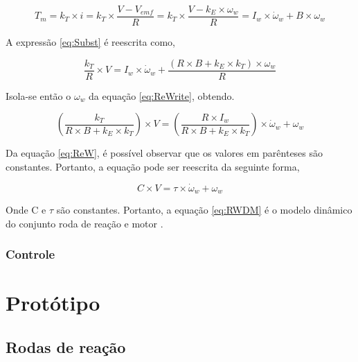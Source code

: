 \documentclass[
	12pt,				%
	openany,			%
	twoside,			%
	a4paper,			%
	english,			%
	french,				%
	spanish,			%
	brazil,				%
	oldfontcommands
	]{abntex2}
\begin{document}
\begin{equation}
T_{m} = k_{T} \times i = k_{T} \times \frac{V - V_{emf}}{R} = k_{T} \times \frac{ V - k_{E} \times \omega_{w} }{R} = I_{w} \times \dot{\omega}_{w} + B \times \omega_{w}
\label{eq:Subst}
\end{equation}

A expressão \ref{eq:Subst} é reescrita como,

\begin{equation}
\frac{k_{T}}{R} \times V = I_{w} \times \dot{\omega}_{w} + \frac{(R \times B + k_{E} \times k_{T}) \times \omega_{w} }{R}
\label{eq:ReWrite}
\end{equation}

Isola-se então o $\omega_{w}$ da equação \ref{eq:ReWrite}, obtendo.

\begin{equation}
\left( \frac{k_{T}}{R \times B + k_{E} \times k_{T}} \right) \times V = \left( \frac{R \times I_{w}}{R \times B + k_{E} \times k_{T}} \right) \times \dot{\omega}_{w} + \omega_{w}
\label{eq:ReW}
\end{equation}

Da equação \ref{eq:ReW}, é possível observar que os valores em parênteses são constantes. Portanto, a equação pode ser reescrita da seguinte forma,

\begin{equation}
C \times V = \tau \times \dot{\omega}_{w} + \omega_{w}
\label{eq:RWDM}
\end{equation}

Onde C e $\tau$ são constantes. Portanto, a equação \ref{eq:RWDM} é o modelo dinâmico do conjunto roda de reação e motor \cite{Ericksson}.

\subsection{Controle}



\chapter[Protótipo]{Protótipo}



\section{Rodas de reação}
\end{document}
